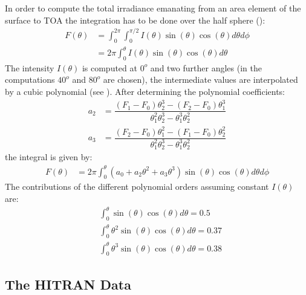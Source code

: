 In order to compute the total irradiance emanating from an area element of the surface to TOA the integration has to be done over the half sphere ():
\begin{align}
	F(\theta) &= \int_0^{2 \pi} \int_0^{\pi/2} I(\theta) \sin(\theta) \cos(\theta)  d \theta d \phi \\
	  &= 2 \pi \int_0^{\theta} I(\theta) \sin(\theta) \cos(\theta) d \theta
\end{align}
The intensity $I(\theta)$ is computed at $0^o$ and two further angles (in the computations $40^o$ and $80^o$ are chosen),
the intermediate values are interpolated by a cubic polynomial (see ).
After determining the polynomial coefficients:
\begin{align}
	a_2 &= \dfrac{(F_1 - F_0) \theta_2^3 - (F_2 - F_0) \theta_1^3}{\theta_1^2 \theta_2^3 - \theta_1^3 \theta_2^2} \\
	a_3 &= \dfrac{(F_2 - F_0) \theta_1^2 - (F_1 - F_0) \theta_2^2}{\theta_1^2 \theta_2^3 - \theta_1^3 \theta_2^2}
 \end{align}
the integral is given by:
\begin{align}
	F(\theta) &= 2 \pi \int_0^{\theta} \left(a_0 + a_2 \theta^2 + a_3 \theta^3\right) \sin(\theta) \cos(\theta)  d \theta d \phi
\end{align}
The contributions of the different polynomial orders assuming constant $I(\theta)$ are:
\begin{align*}
	 &\int_0^{\theta} \sin(\theta) \cos(\theta) d \theta = 0.5 \\
	 &\int_0^{\theta} \theta^2 \sin(\theta) \cos(\theta) d \theta = 0.37  \\
	 &\int_0^{\theta} \theta^3 \sin(\theta) \cos(\theta) d \theta = 0.38
\end{align*}

\subsection{The HITRAN Data}

